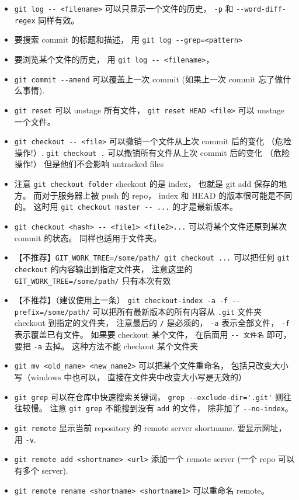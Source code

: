 \begin{itemize}
\item \verb|git log -- <filename>| 可以只显示一个文件的历史， \verb|-p| 和 \verb|--word-diff-regex| 同样有效。
\item 要搜索 commit 的标题和描述， 用 \verb|git log --grep=<pattern>|
\item 要浏览某个文件的历史， 用 \verb|git log -- <filename>|， 
\item \verb|git commit --amend| 可以覆盖上一次 commit (如果上一次 commit 忘了做什么事情).
\item \verb|git reset| 可以 unstage 所有文件， \verb|git reset HEAD <file>| 可以 unstage 一个文件。
\item \verb|git checkout -- <file>| 可以撤销一个文件从上次 commit 后的变化 （危险操作!）. \verb|git checkout .| 可以撤销所有文件从上次 commit 后的变化 （危险操作!） 但是他们不会影响 untracked files
\item 注意 \verb|git checkout folder| checkout 的是 index， 也就是 git add 保存的地方。 而对于服务器上被 push 的 repo， index 和 HEAD 的版本很可能是不同的。 这时用 \verb|git checkout master -- ...| 的才是最新版本。
\item \verb|git checkout <hash> -- <file1> <file2>...| 可以将某个文件还原到某次 commit 的状态。 同样也适用于文件夹。
\item 【不推荐】\verb|GIT_WORK_TREE=/some/path/ git checkout ...| 可以把任何 \verb|git checkout| 的内容输出到指定文件夹， 注意这里的 \verb|GIT_WORK_TREE=/some/path/| 只有本次有效
\item 【不推荐】（建议使用上一条） \verb|git checkout-index -a -f --prefix=/some/path/| 可以把所有最新版本的所有内容从 \verb|.git| 文件夹 checkout 到指定的文件夹， 注意最后的 \verb|/| 是必须的， \verb|-a| 表示全部文件， \verb|-f| 表示覆盖已有文件。 如果要 checkout 某个文件， 在后面用 \verb|-- 文件名| 即可， 要把 \verb|-a| 去掉。 这种方法不能 checkout 某个文件夹
\item \verb|git mv <old_name> <new_name2>| 可以把某个文件重命名， 包括只改变大小写（windows 中也可以， 直接在文件夹中改变大小写是无效的）
\item \verb|git grep| 可以在仓库中快速搜索关键词， \verb|grep --exclude-dir='.git'| 则往往较慢。 注意 \verb|git grep| 不能搜到没有 \verb|add| 的文件， 除非加了 \verb|--no-index|。
\item \verb|git remote| 显示当前 repository 的 remote server shortname. 要显示网址， 用 \verb|-v|.
\item \verb|git remote add <shortname> <url>| 添加一个 remote server (一个 repo 可以有多个 server).
\item \verb|git remote rename <shortname> <shortname1>| 可以重命名 remote。

\end{itemize}
